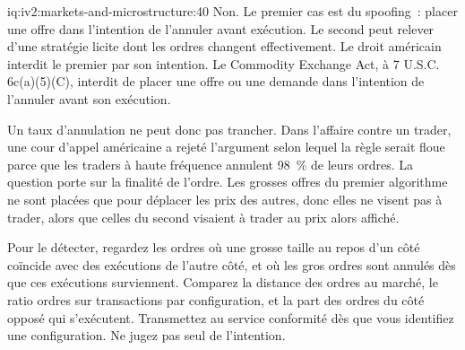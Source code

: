 \begin{solution}{iq:iv2:markets-and-microstructure:40}
Non. Le premier cas est du spoofing~: placer une offre dans l'intention de l'annuler avant exécution. Le second peut relever d'une stratégie licite dont les ordres changent effectivement. Le droit américain interdit le premier par son intention. Le Commodity Exchange Act, à 7 U.S.C. 6c(a)(5)(C), interdit de placer une offre ou une demande dans l'intention de l'annuler avant son exécution.

Un taux d'annulation ne peut donc pas trancher. Dans l'affaire contre un trader, une cour d'appel américaine a rejeté l'argument selon lequel la règle serait floue parce que les traders à haute fréquence annulent 98~\% de leurs ordres. La question porte sur la finalité de l'ordre. Les grosses offres du premier algorithme ne sont placées que pour déplacer les prix des autres, donc elles ne visent pas à trader, alors que celles du second visaient à trader au prix alors affiché.

Pour le détecter, regardez les ordres où une grosse taille au repos d'un côté coïncide avec des exécutions de l'autre côté, et où les gros ordres sont annulés dès que ces exécutions surviennent. Comparez la distance des ordres au marché, le ratio ordres sur transactions par configuration, et la part des ordres du côté opposé qui s'exécutent. Transmettez au service conformité dès que vous identifiez une configuration. Ne jugez pas seul de l'intention.

\end{solution}

